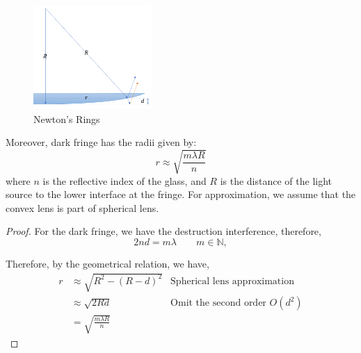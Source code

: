 \documentclass[openany]{book}
\begin{document}
\begin{figure}
  \vspace{-20pt}  
  \begin{center}
    \includegraphics[width=0.4\textwidth]{Figure/21.PNG}
  \end{center}  
  \vspace{-20pt}  
  \caption{Newton's Rings}
  \label{fig:21}
\end{figure}
Moreover, dark fringe has the radii given by: 
\[r \approx \sqrt{\frac{m\lambda R}{n}}\]
where $n$ is the reflective index of the glass, and $R$ is the distance of the light source to the lower interface at the fringe. For approximation, we assume that the convex lens is part of spherical lens.

\begin{proof}
For the dark fringe, we have the destruction interference, therefore, 
\[2nd=m\lambda \qquad m\in \mathbb{N},\]

Therefore, by the geometrical relation, we have,
\begin{align*}
r&\approx\sqrt{R^2-\left(R-d\right)^2} &\textrm{Spherical lens approximation}\\
&\approx \sqrt{2Rd}&\textrm{Omit the second order }O(d^2)\\
&=\sqrt{\frac{m\lambda R}{n}}&~
\end{align*}
\end{proof}
\end{document}
